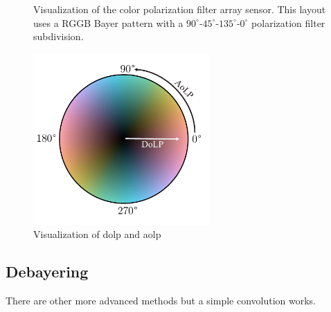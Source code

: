 \begin{figure}[H]
\begin{subfigure}{.5\textwidth}
    \end{subfigure}
    \caption{Visualization of the color polarization filter array sensor.
        This layout uses a RGGB Bayer pattern with a $90^\circ$-$45^\circ$-$135^\circ$-$0^\circ$ polarization filter subdivision.
        \label{fig:polarization_naming}}

\end{figure}

\begin{figure}[H]
    \centering
    \includegraphics[width=0.6\textwidth]{figures/cmap/aolp_dolp_cmap.pdf}
    \caption{Visualization of \gls{dolp} and \gls{aolp}}
\end{figure}

\subsection*{Debayering}
There are other more advanced methods but a simple convolution works.






